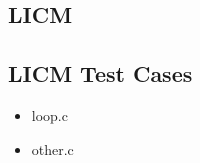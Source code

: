 \subsection{LICM}

{\tiny }

\subsection{LICM Test Cases}

\begin{itemize}
   \item loop.c

   {\tiny }

   \item other.c

   {\tiny }
\end{itemize}
